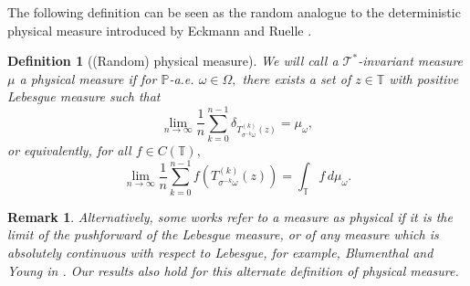 \documentclass[12pt,reqno]{amsart}
\numberwithin{theorem}{section}
\newtheorem{definition}[theorem]{Definition}%
\newtheorem{remark}[theorem]{Remark}%
\begin{document}
The following definition can be seen as the random analogue to the deterministic physical measure introduced by Eckmann and Ruelle \cite{eckman_ruelle}. 
\begin{definition}[(Random) physical measure]\label{physical_measure_defn}
    We will call a $\mathcal{T}^{*}$-invariant measure $\mu$ a physical measure if for $\mathbb{P}$-a.e. $\omega\in\Omega,$ there exists a set of $z\in\mathbb{T}$ with positive Lebesgue measure such that $$\lim_{n\to\infty}\frac{1}{n}\sum_{k=0}^{n-1}\delta_{T_{\sigma^{-k}\omega}^{(k)}(z)}=\mu_{\omega},$$ or equivalently, for all $f\in C(\mathbb{T}),$ $$\lim_{n\to\infty}\frac{1}{n}\sum_{k=0}^{n-1}f(T_{\sigma^{-k}\omega}^{(k)}(z))=\int_{\mathbb{T}}f\,d\mu_{\omega}.$$ 
\end{definition}
\begin{remark}
    Alternatively, some works refer to a measure as physical if it is the limit of the pushforward of the Lebesgue measure, or of any measure which is absolutely continuous with respect to Lebesgue, for example, Blumenthal and Young in \cite{blumenthal_young}. Our results also hold for this alternate definition of physical measure.
\end{remark}
\end{document}
